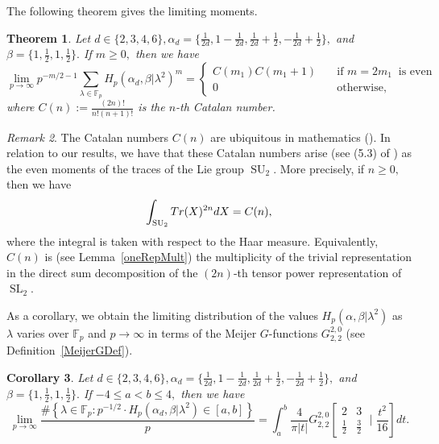 \documentclass[12pt]{amsart}
\newtheorem{theorem}{Theorem}[section]
\newtheorem{corollary}[theorem]{Corollary}
\theoremstyle{definition}
\theoremstyle{remark}
\newtheorem{remark}[theorem]{Remark}
\numberwithin{equation}{section}
\def\Tr{{\rm Tr}}
\def\F{{\mathbb F}}
\def\F{\mathbb{F}}
\DeclareMathOperator{\SL}{SL}
\DeclareMathOperator{\SU}{SU}
\begin{document}
The following theorem gives the limiting moments.
\begin{theorem}\label{theorem1}
Let $d \in \{2,3,4,6\}, \alpha_d=\{\frac{1}{2d},1-\frac{1}{2d},\frac{1}{2d}+\frac{1}{2},-\frac{1}{2d}+\frac{1}{2}\},$ and $\beta=\{1,\frac{1}{2},1,\frac{1}{2}\}.$ If $m\geq 0,$ then we have
$$
\lim\limits_{p\to\infty}{p^{-m/2-1}}\sum\limits_{\lambda\in\F_p} H_{p}(\alpha_d,\beta|\lambda^2)^{m}= \begin{cases}
    C(m_1)C(m_1+1) &\ \ \ \text{ if } m=2m_1\ \text{ is even} \\
    0 &\ \ \ \text{ otherwise,}
\end{cases}
$$
where $C(n):=\frac{(2n)!}{n!(n+1)!}$ is the $n$-th Catalan number.
\end{theorem}

\begin{remark}
    The Catalan numbers $C(n)$ are ubiquitous in mathematics (\cite{CatalanBook}). In relation to our results, we have that these Catalan numbers
    arise  (see (5.3) of \cite{SatoTateGroups}) as the even moments of the traces of the Lie group $\SU_2.$ More precisely, if $n\geq 0,$ then we have
    $$
    \int_{\SU_2}\Tr(X)^{2n}dX = C(n),
    $$
    where the integral is taken with respect to the Haar measure. Equivalently, $C(n)$ is (see Lemma~\ref{oneRepMult}) the multiplicity of the trivial representation in the direct sum decomposition of the $(2n)$-th tensor power representation of $\SL_2.$
\end{remark}

As a corollary, we obtain the limiting distribution of the values $H_p(\alpha,\beta|\lambda^2)$ as $\lambda$ varies over $\F_p$ and $p\to\infty$ in terms of the Meijer $G$-functions $G_{2,2}^{2,0}$ (see Definition~\ref{MeijerGDef}).


\begin{corollary}\label{corollary1}
 Let $d \in \{2,3,4,6\}, \alpha_d=\{\frac{1}{2d},1-\frac{1}{2d},\frac{1}{2d}+\frac{1}{2},-\frac{1}{2d}+\frac{1}{2}\},$ and $\beta=\{1,\frac{1}{2},1,\frac{1}{2}\}.$ If $-4\leq a<b\leq 4,$ then we have
        $$
        \lim\limits_{p\to\infty}\frac{\#\left\{\lambda\in\F_p : p^{-1/2}\cdot H_p(\alpha_d,\beta|\lambda^2)\in[a,b] \right\}}{p} = \int_a^b\frac{4}{\pi |t|} G_{2,2}^{2,0} \left[\begin{matrix} 2 & 3 \\  \frac{1}{2} & \frac{3}{2}\end{matrix} \; \bigg| \; \frac{t^2}{16} \right]dt.
        $$
\end{corollary}
\end{document}
